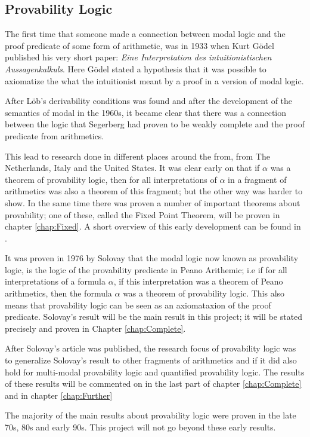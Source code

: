 \documentclass[../main.tex]{subfiles}
\begin{document}
\subsection{Provability Logic}
The first time that someone made a connection between modal logic and the proof
predicate of some form of arithmetic, was in 1933 when Kurt Gödel published his very short  paper:
\textit{Eine
Interpretation des intuitionistischen Aussagenkalkuls}. Here Gödel
stated a hypothesis that it was possible to axiomatize the what the
intuitionist meant by a proof in a version of modal logic.

After Löb's derivability conditions was found and after the development of the
semantics of modal in the 1960s, it became clear that there was a connection
between the logic that Segerberg had proven to be weakly complete and the proof
predicate from arithmetics.

This lead to research done in different places around the from, from The
Netherlands, Italy and the United States. It was clear early on that if
$\alpha$ was a theorem of provability logic, then for all interpretations of
$\alpha$ in a fragment of arithmetics was also a theorem of this fragment; but
the other way was harder to show. In the same time there was proven a number of
important theorems about provability; one of these, called the Fixed Point
Theorem,  will be proven in chapter
\ref{chap:Fixed}.
A short overview of this early
development can be found in \parencite{Bool1991}.

It was proven in 1976 by Solovay that the modal
logic now known as provability logic, is the logic of the provability predicate
in Peano Arithemic; i.e if for all interpretations
of a formula $\alpha$, if this interpretation was a theorem of Peano
arithmetics,
then the formula $\alpha$ was a theorem of provability logic. This also means that
provability logic can be seen as an axiomataxion of the proof predicate.
Solovay's result will be the main result in this project; it will be stated
precisely and proven in Chapter \ref{chap:Complete}.

After Solovay's article was published, the research focus of provability logic
was to generalize Solovay's result to other fragments of arithmetics and if
it did also hold for multi-modal provability logic and quantified provability
logic. The results of these results will be commented on in the last part of
chapter \ref{chap:Complete} and in chapter \ref{chap:Further}

The majority of the main results about provability logic were proven in the late
70s, 80s and early 90s. This project will not go beyond these early results.
\end{document}
